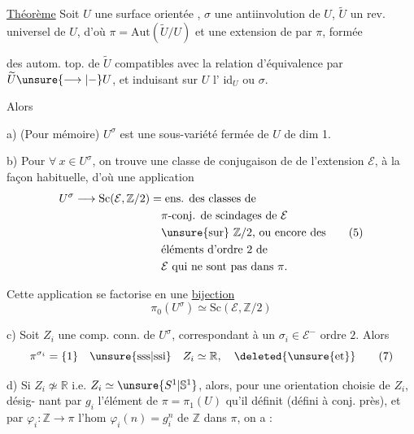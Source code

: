 \uline{Théorème} Soit $U$ une surface orientée ,  $\sigma$ une antiinvolution de $U$, $\widetilde U$ un rev. universel de $U$, d'où $\pi=\mathrm{Aut}(\widetilde U/U)$ et une extension  de  par $\pi$, formée

des autom. top. de $\widetilde U$ compatibles avec la
relation d'équivalence  par $\widetilde U\unsure{\longrightarrow|-}U$, et
induisant sur $U$ l' $\mathrm{id}_U$ ou $\sigma$.

 Alors

a) (Pour mémoire) $U^\sigma$ est une sous-variété fermée
de $U$ de dim 1.

b) Pour $\forall\ x\in U^\sigma$, on trouve une classe
de \inserted{$\pi$-}conjugaison de  de l'extension
$\mathcal E$, à la façon habituelle, d'où une
application
\[
 \begin{aligned}
 U^\sigma\longrightarrow\mathrm{Sc}(\mathcal E,\mathbb Z/2)
 &=\text{ens. des classes de}\\
 &\quad\text{$\pi$-conj. de scindages de $\mathcal E$}\\
 &\quad\text{\unsure{sur} $\mathbb Z/2$, ou encore des}\\
 &\quad\text{éléments d'ordre $2$ de}\\
 &\quad\text{$\mathcal E$ qui ne sont pas dans $\pi$.}
 \end{aligned}
 \tag{5}
\]

Cette application se factorise en une
\uline{bijection}
\[
 \pi_0(U^\sigma)\simeq\mathrm{Sc}(\mathcal E,\mathbb Z/2)
 \tag{6}
\]

c) Soit $Z_i$ une comp. conn. de $U^\sigma$,
correspondant à un  $\sigma_i\in\mathcal E^-$ 
ordre $2$. Alors 
\[
 \pi^{\sigma_i}=\{1\}\quad\text{\unsure{sss|ssi}}\quad Z_i\simeq\mathbb R,
 \quad\deleted{\unsure{\text{et}}}
 \tag{7}
\]

d) Si $Z_i\not\simeq\mathbb R$ i.e.  $Z_i\simeq\unsure{S^1|\mathbb S^1}$, alors,
pour une orientation choisie de $Z_i$, désig-
nant par $g_i$ l'élément de $\pi=\pi_1(U)$
qu'il définit (défini à conj. près), et
par $\varphi_i:\mathbb Z\longrightarrow\pi$ l'hom $\varphi_i(n)=g_i^n$ de
$\mathbb Z$ dans $\pi$, on a :

